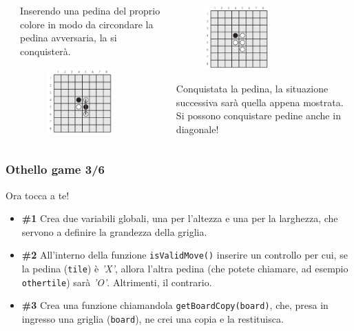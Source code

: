 \documentclass{beamer}
\begin{document}
\begin{frame}[fragile]
\begin{columns}
\begin{column}[T]{0.3\textwidth}
	\end{column}
	\begin{column}[T]{0.3\textwidth}
		\begin{center}
			Inserendo una pedina del proprio colore in modo da circondare la pedina avversaria, la si conquisterà.
		\begin{figure}[t]
			\includegraphics[height=2.5cm, width=2.5cm]{images/ReverseGame2.png}
		\end{figure}
		\end{center}
	\end{column}
	\begin{column}[T]{0.3\textwidth}
		\begin{center}
		\begin{figure}[t]
			\includegraphics[height=2.5cm, width=2.5cm]{images/ReverseGame3.png}
		\end{figure}
		Conquistata la pedina, la situazione successiva sarà quella appena mostrata. Si possono conquistare pedine anche in diagonale!
	\end{center}
	\end{column}
\end{columns}

\end{frame}

\begin{frame}[fragile]
\frametitle{Othello game 3/6}
\begin{block}{Ora tocca a te!}
	\begin{itemize}
		\item \textbf{\#1} Crea due variabili globali, una per l'altezza e una per la larghezza, che servono a definire la grandezza della griglia.
		\item \textbf{\#2} All'interno della funzione \texttt{isValidMove()} inserire un controllo per cui, se la pedina (\texttt{tile}) è \textit{'X'}, allora l'altra pedina (che potete chiamare, ad esempio \texttt{othertile}) sarà \textit{'O'}. Altrimenti, il contrario.
		\item \textbf{\#3} Crea una funzione chiamandola \texttt{getBoardCopy(board)}, che, presa in ingresso una griglia (\texttt{board}), ne crei una copia e la restituisca.
	\end{itemize}
\end{block}
\end{frame}
\end{document}
